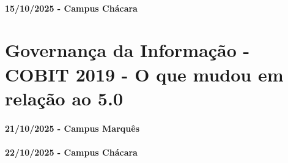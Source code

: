 \documentclass[
]{book}
\begin{document}
\subsubsection*{15/10/2025 - Campus Chácara}\label{campus-chuxe1cara-9}

\chapter{Governança da Informação - COBIT 2019 - O que mudou em relação ao 5.0}\label{governanuxe7a-da-informauxe7uxe3o---cobit-2019---o-que-mudou-em-relauxe7uxe3o-ao-5.0}

\subsubsection*{21/10/2025 - Campus Marquês}\label{campus-marquuxeas-10}

\subsubsection*{22/10/2025 - Campus Chácara}\label{campus-chuxe1cara-10}

  
\end{document}
